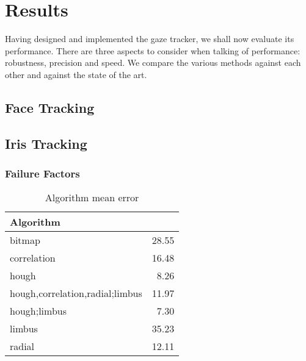 \chapter{Results}

Having designed and implemented the gaze tracker, we shall now evaluate its performance.
There are three aspects to consider when talking of performance: robustness, precision and speed.
We compare the various methods against each other and against the state of the art.

\section{Face Tracking}


\section{Iris Tracking}

\subsection{Failure Factors}
\label{s:results-eyecovar}


\begin{table}[b!]
\centering
\begin{tabular}{l@{\hspace{1.5cm}}D{.}{.}{3.2}}
\toprule
\textbf{Algorithm} &  \\
\midrule
bitmap & 28.55 \\
correlation & 16.48 \\
hough & 8.26 \\
hough,correlation,radial;limbus & 11.97 \\
hough;limbus & 7.30 \\
limbus & 35.23 \\
radial & 12.11 \\
\bottomrule
\end{tabular}
\caption{Algorithm mean error}\label{t:algo-mean}
\end{table}

